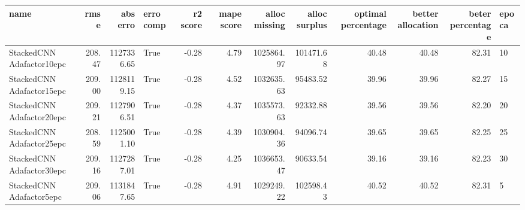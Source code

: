 \begin{tabular}{lrrlrrrrrrrl}
\toprule
name & rmse & abs erro & erro comp & r2 score & mape score & alloc missing & alloc surplus & optimal percentage & better allocation & beter percentage & epoca \\
\midrule
StackedCNN Adafactor10epc & 208.47 & 1127336.65 & True & -0.28 & 4.79 & 1025864.97 & 101471.68 & 40.48 & 40.48 & 82.31 & 10 \\
StackedCNN Adafactor15epc & 209.00 & 1128119.15 & True & -0.28 & 4.52 & 1032635.63 & 95483.52 & 39.96 & 39.96 & 82.27 & 15 \\
StackedCNN Adafactor20epc & 209.21 & 1127906.51 & True & -0.28 & 4.37 & 1035573.63 & 92332.88 & 39.56 & 39.56 & 82.20 & 20 \\
StackedCNN Adafactor25epc & 208.59 & 1125001.10 & True & -0.28 & 4.39 & 1030904.36 & 94096.74 & 39.65 & 39.65 & 82.25 & 25 \\
StackedCNN Adafactor30epc & 209.16 & 1127287.01 & True & -0.28 & 4.25 & 1036653.47 & 90633.54 & 39.16 & 39.16 & 82.23 & 30 \\
StackedCNN Adafactor5epc & 209.06 & 1131847.65 & True & -0.28 & 4.91 & 1029249.22 & 102598.43 & 40.52 & 40.52 & 82.31 & 5 \\
\bottomrule
\end{tabular}
